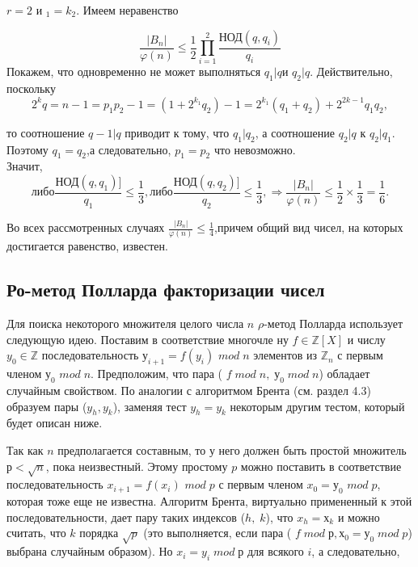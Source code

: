 	\begin{beznomera}[Случай]
		$r=2$ и $_1 = k_2$. Имеем неравенство 
		
		\begin{equation}
		\frac{|B_n|}{\varphi(n)} \leqslant \frac{1}{2}\prod^{2}_{i=1} \frac{\text{НОД}(q,q_i)}{q_i}
		\end{equation}
		Покажем, что одновременно не может выполняться $q_1 | q$и $q_2|q$. Действительно, поскольку 
		\begin{equation}
		2^kq=n-1=p_1p_2-1=(1+2^{k_{1}}q_2)-1=2^{k_1}(q_1+q_2)+2^{2k-1}q_1q_2,
		\end{equation}
	
		то соотношение $q-1|q$ приводит к тому, что  $q_1|q_2$, а соотношение $q_2|q$ к $q_2|q_1$. Поэтому $q_1=q_2$,а следовательно, $p_1=p_2$ что невозможно. \\	Значит,
		\begin{equation}
		\text{либо} \frac{\text{НОД}(q,q_1)]}{q_1} \leqslant \frac{1}{3}, \text{либо} \frac{\text{НОД}(q,q_2)]}{q_2} \leqslant \frac{1}{3}, \Rightarrow \frac{|B_n|}{\varphi(n)} \leqslant \frac{1}{2} \times \frac{1}{3} = \frac{1}{6}.
		\end{equation}
		
	\end{beznomera}	

	Во всех рассмотренных случаях $\frac{|B_n|}{\varphi(n)} \leqslant \frac{1}{4}$,причем общий вид чисел, на	которых достигается равенство, известен.
	
	\pagebreak
	
	\subsection{Ро-метод Полларда факторизации чисел}
	\noindent
	Для поиска некоторого множителя целого числа $n$ $\rho$-метод Поллар­да использует следующую идею. Поставим в соответствие многочле ну $f \in \mathbb Z[X]$ и числу $y_0 \in \mathbb Z$ последовательность $у_{i+1} = f(y_i)$ $mod\;n$
	элементов из $\mathbb Z_n$ с первым членом $у_0$ $mod\;n$. Предположим, что пара ( $f\;mod \;n,\;у_0\;mod\;n$) обладает случайным свойством. По аналогии с алгоритмом Брента (см. раздел 4.3) образуем пары ($y_h,y_k$), заменяя тест	$y_h=y_k$
	некоторым другим тестом, который будет описан ниже.
	
	Так как $n$ предполагается составным, то у него должен быть про­стой множитель $р < \sqrt{n}$, пока неизвестный. Этому простому $p$ можно	поставить в соответствие последовательность $x_{i+1} = f(x_i)$ $mod\;p$ с первым членом $x_0 = у_0$ $mod\;p$, которая тоже еще не известна. Алгоритм	Брента, виртуально примененный к этой последовательности, дает пару таких индексов ($h,\;k$), что $x_h= х_k$
	и можно считать, что $k$ порядка	$\sqrt{p}$ (это выполняется, если пара ( $f\;mod\;р, х_0 = у_0\;mod\;p$) выбрана случайным образом). Но $x_i = y_i\;mod\;р$ для всякого $i$, а следовательно,
	
